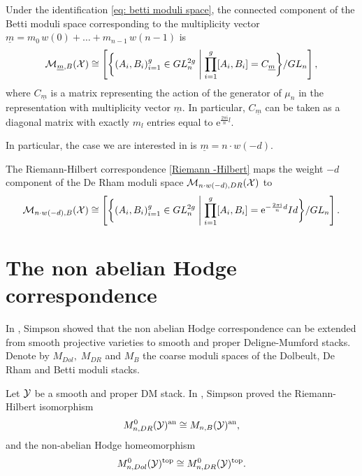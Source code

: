 \documentclass{article}
\begin{document}
\begin{cor}\label{cor: betti moduli space decomposition}
Under the identification \eqref{eq: betti moduli space}, the connected component of the Betti moduli space corresponding to the multiplicity vector $\underline{m}= m_0 \, w(0) + \dots + m_{n-1} \, w(n-1)$ is
\begin{equation}
\mathcal{M}_{\underline{m}, B}(\mathcal{X}) \cong \left[ \bigg\{ (A_i, B_i)_{i = 1}^g \in GL_n^{2g} \;\middle|\; \prod_{i=1}^{g}[A_i, B_i] = C_{\underline{m}} \bigg\} / GL_n \right],
\end{equation}
where $C_{\underline{m}}$ is a matrix representing the action of the generator of $\mu_n$ in the representation with multiplicity vector $\underline{m}$. In particular, $C_{\underline{m}}$ can be taken as a diagonal matrix with exactly $m_l$ entries equal to $\mathrm{e}^{\frac{2 \pi \mathrm{i}}{n} l}$.
\end{cor}
In particular, the case we are interested in is $\underline{m} = n \cdot w(-d)$.
\begin{cor}
The Riemann-Hilbert correspondence \eqref{Riemann -Hilbert} maps the weight $-d$ component of the De Rham moduli space $\mathcal{M}_{n \cdot w(-d), DR}(\mathcal{X})$ to
\begin{equation}
\mathcal{M}_{n \cdot w(-d), B}(\mathcal{X}) \cong \left[ \bigg\{ (A_i, B_i)_{i = 1}^g \in GL_n^{2g} \;\middle|\; \prod_{i=1}^{g}[A_i, B_i] = \mathrm{e}^{-\frac{2 \pi \mathrm{i}}{n} d} Id \bigg\} / GL_n \right].
\end{equation}
\end{cor}

\section{The non abelian Hodge correspondence}
In \cite[]{simpson-local_systems_on_proper}, Simpson showed that the non abelian Hodge correspondence can be extended from smooth projective varieties to smooth and proper Deligne-Mumford stacks. Denote by $M_{Dol}, \; M_{DR}$ and $M_B$ the coarse moduli spaces of the Dolbeult, De Rham and Betti moduli stacks.

Let $\mathcal{Y}$ be a smooth and proper DM stack. In \cite[]{simpson-local_systems_on_proper}, Simpson proved the Riemann-Hilbert isomorphism
\begin{equation} \label{riemann hilbert DM stack}
M_{n, DR}^0(\mathcal{Y})^{\text{an}} \cong M_{n, B}(\mathcal{Y})^{\text{an}},
\end{equation}
and the non-abelian Hodge homeomorphism
\begin{equation}\label{non abelian Hodge DM stack}
M_{n, Dol}^0(\mathcal{Y})^{\text{top}} \cong M_{n, DR}^0(\mathcal{Y})^{\text{top}}.
\end{equation}
\end{document}
